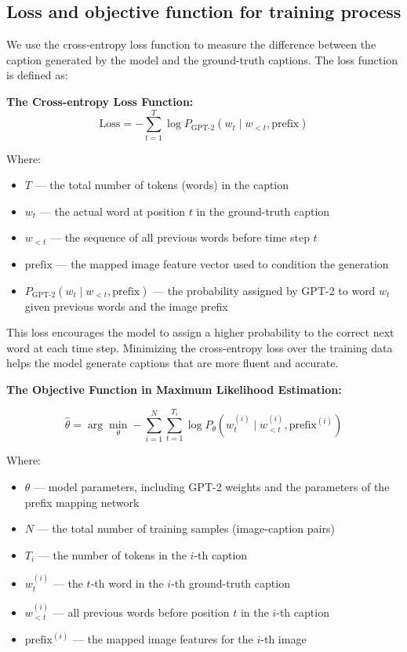 \documentclass[11pt]{article}
\begin{document}
\subsection{Loss and objective function for training process}

We use the cross-entropy loss function to measure the difference between the caption generated by the model and the ground-truth captions. The loss function is defined as:

\textbf{The Cross-entropy Loss Function:}
\begin{equation}
\text{Loss} = -\sum_{t=1}^{T} \log P_{\text{GPT-2}}(w_t \mid w_{<t}, \text{prefix})
\end{equation}

Where:  
\begin{itemize}
    \item $T$ — the total number of tokens (words) in the caption  
    \item $w_t$ — the actual word at position $t$ in the ground-truth caption  
    \item $w_{<t}$ — the sequence of all previous words before time step $t$  
    \item $\text{prefix}$ — the mapped image feature vector used to condition the generation  
    \item $P_{\text{GPT-2}}(w_t \mid w_{<t}, \text{prefix})$ — the probability assigned by GPT-2 to word $w_t$ given previous words and the image prefix
\end{itemize}

This loss encourages the model to assign a higher 
probability to the correct next word at each time step. 
Minimizing the cross-entropy loss over the training data 
helps the model generate captions that are more fluent 
and accurate.

\pagebreak
\textbf{The Objective Function in Maximum Likelihood Estimation:}

\begin{equation}
\hat{\theta} = \arg\min_{\theta} -\sum_{i=1}^{N} \sum_{t=1}^{T_i} \log P_\theta(w_t^{(i)} \mid w_{<t}^{(i)}, \text{prefix}^{(i)})
\end{equation}

Where:
\begin{itemize}
    \item $\theta$ — model parameters, including GPT-2 weights and the parameters of the prefix mapping network  
    \item $N$ — the total number of training samples (image-caption pairs)  
    \item $T_i$ — the number of tokens in the $i$-th caption  
    \item $w_t^{(i)}$ — the $t$-th word in the $i$-th ground-truth caption  
    \item $w_{<t}^{(i)}$ — all previous words before position $t$ in the $i$-th caption  
    \item $\text{prefix}^{(i)}$ — the mapped image features for the $i$-th image
\end{itemize}
\end{document}
